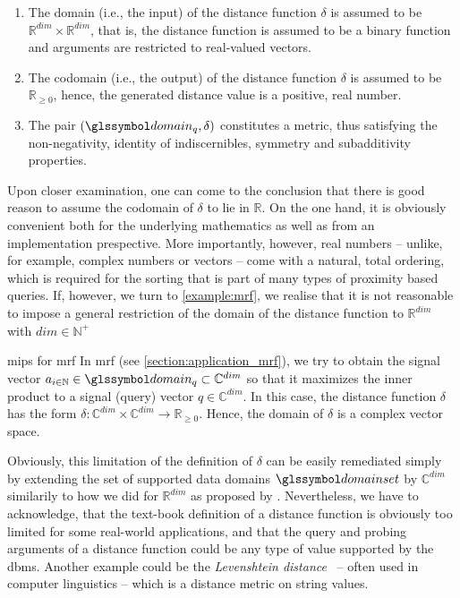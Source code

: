 \begin{enumerate}
    \item The domain (i.e., the input) of the distance function $\delta$ is assumed to be $\mathbb{R}^{dim} \times \mathbb{R}^{dim}$, that is, the distance function is assumed to be a binary function and arguments are restricted to real-valued vectors.
    \item The codomain (i.e., the output) of the distance function $\delta$ is assumed to be $\mathbb{R}_{\geq 0}$, hence, the generated distance value is a positive, real number.
    \item The pair $(\domain_q,\delta)$ constitutes a metric, thus satisfying the non-negativity, identity of indiscernibles, symmetry and subadditivity properties.
\end{enumerate}

Upon closer examination, one can come to the conclusion that there is good reason to assume the codomain of $\delta$ to lie in $\mathbb{R}$. On the one hand, it is obviously convenient both for the underlying mathematics as well as from an implementation prespective. More importantly, however, real numbers -- unlike, for example, complex numbers or vectors -- come with a natural, total ordering, which is required for the sorting that is part of many types of proximity based queries. If, however, we turn to \cref{example:mrf}, we realise that it is not reasonable to impose a general restriction of the domain of the distance function to $\mathbb{R}^{dim}$ with $dim \in \mathbb{N^{+}}$

\begin{example}[label=example:mrf]{\acrlong{mips}{} for \acrshort{mrf}}{}
    In \acrshort{mrf} (see \cref{section:application_mrf}), we try to obtain the signal vector $a_{i \in \mathbb{N}} \in \domain_q \subset \mathbb{C}^{dim}$ so that it maximizes the inner product to a signal (query) vector $q \in \mathbb{C}^{dim}$. In this case, the distance function $\delta$ has the form $\delta \colon \mathbb{C}^{dim} \times \mathbb{C}^{dim} \to \mathbb{R}_{\geq 0}$. Hence, the domain of $\delta$ is a complex vector space.
\end{example}

Obviously, this limitation of the definition of $\delta$ can be easily remediated simply by extending the set of supported data domains $\domainset$ by $\mathbb{C}^{dim}$ similarily to how we did for $\mathbb{R}^{dim}$ as proposed by \cite{Giangreco:2018thesis}. Nevertheless, we have to acknowledge, that the text-book definition of a distance function is obviously too limited for some real-world applications, and that the query and probing arguments of a distance function could be any type of value supported by the \acrshort{dbms}. Another example could be the \emph{Levenshtein distance}~\cite{Levensthtein:1965Binary} -- often used in computer linguistics -- which is a distance metric on string values.

